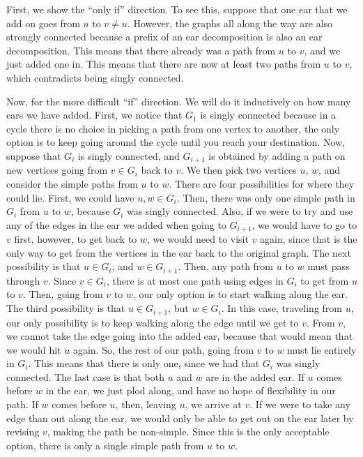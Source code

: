 \documentclass{article}
\begin{document}
First, we show the ``only if'' direction. To see this, suppose that one ear that we add on goes from $u$ to $v\neq u$. However, the graphs all along the way are also strongly connected because a prefix of an ear decomposition is also an ear decomposition. This means that there already was a path from $u$ to $v$, and we just added one in. This means that there are now at least two paths from $u$ to $v$, which contradicts being singly connected.

Now, for the more difficult ``if'' direction. We will do it inductively on how many ears we have added. First, we notice that $G_1$ is singly connected because in a cycle there is no choice in picking a path from one vertex to another, the only option is to keep going around the cycle until you reach your destination. Now, suppose that $G_i$ is singly connected, and $G_{i+1}$ is obtained by adding a path on new vertices going from $v\in G_i$ back to $v$. We then pick two vertices $u$, $w$, and consider the simple paths from $u$ to $w$. There are four possibilities for where they could lie. First, we could have $u, w \in G_i$. Then, there was only one simple path in $G_i$ from $u$ to $w$, because $G_i$ was singly connected. Also, if we were to try and use any of the edges in the ear we added when going to $G_{i+1}$, we would have to go to $v$ first, however, to get back to $w$, we would need to visit $v$ again, since that is the only way to get from the vertices in the ear back to the original graph. The next possibility is that $u\in G_i$, and $w\in G_{i+1}$. Then, any path from $u$ to $w$ must pass through $v$. Since $v\in G_i$, there is at most one path using edges in $G_i$ to get from $u$ to $v$. Then, going from $v$ to $w$, our only option is to start walking along the ear. The third possibility is that $u\in G_{i+1}$, but $w\in G_i$. In this case, traveling from $u$, our only possibility is to keep walking along the edge until we get to $v$. From $v$, we cannot take the edge going into the added ear, because that would mean that we would hit $u$ again. So, the rest of our path, going from $v$ to $w$ must lie entirely in $G_i$. This means that there is only one, since we had that $G_i$ was singly connected. The last case is that both $u$ and $w$ are in the added ear. If $u$ comes before $w$ in the ear, we just plod along, and have no hope of flexibility in our path. If $w$ comes before $u$, then, leaving $u$, we arrive at $v$. If we were to take any edge than out along the ear, we would only be able to get out on the ear later by revising $v$, making the path be non-simple. Since this is the only acceptable option, there is only a single simple path from $u$ to $w$.
\end{document}
